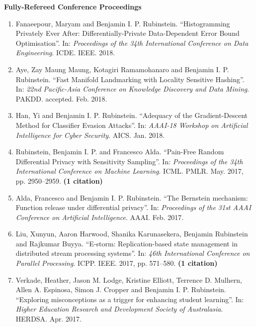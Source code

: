 \documentclass[a4paper,12pt]{article}
\begin{document}
\noindent\textbf{Fully-Refereed Conference Proceedings}

\begin{enumerate}
\setcounter{enumi}{\value{list}}

\item Fanaeepour, Maryam and Benjamin I. P. Rubinstein.
``Histogramming Privately Ever After: Differentially-Private Data-Dependent Error Bound Optimisation''.
In: 
\emph{Proceedings of the 34th International Conference on Data Engineering}.
ICDE.
IEEE.
2018.

\item Aye, Zay Maung Maung, Kotagiri Ramamohanaro and Benjamin I. P. Rubinstein.
``Fast Manifold Landmarking with Locality Sensitive Hashing''.
In: 
\emph{22nd Pacific-Asia Conference on Knowledge Discovery and Data Mining}.
PAKDD.
accepted.
Feb. 2018.

\item Han, Yi and Benjamin I. P. Rubinstein.
``Adequacy of the Gradient-Descent Method for Classifier Evasion Attacks''.
In: 
\emph{AAAI-18 Workshop on Artificial Intelligence for Cyber Security}.
AICS.
Jan. 2018.

\item Rubinstein, Benjamin I. P. and Francesco Alda.
``Pain-Free Random Differential Privacy with Sensitivity Sampling''.
In: 
\emph{Proceedings of the 34th International Conference on Machine Learning}.
ICML.
PMLR.
May. 2017, pp. 2950--2959.
 \textbf{(1 citation)}
\item Alda, Francesco and Benjamin I. P. Rubinstein.
``The Bernstein mechanism: Function release under differential privacy''.
In: 
\emph{Proceedings of the 31st AAAI Conference on Artificial Intelligence}.
AAAI.
Feb. 2017.

\item Liu, Xunyun, Aaron Harwood, Shanika Karunasekera, Benjamin Rubinstein and Rajkumar Buyya.
``E-storm: Replication-based state management in distributed stream processing systems''.
In: 
\emph{46th International Conference on Parallel Processing}.
ICPP.
IEEE.
2017, pp. 571--580.
 \textbf{(1 citation)}
\item Verkade, Heather, Jason M. Lodge, Kristine Elliott, Terrence D. Mulhern, Allen A. Espinosa, Simon J. Cropper and Benjamin I. P. Rubinstein.
``Exploring misconceptions as a trigger for enhancing student learning''.
In: 
\emph{Higher Education Research and Development Society of Australasia}.
HERDSA.
Apr. 2017.


\end{enumerate}
\end{document}
